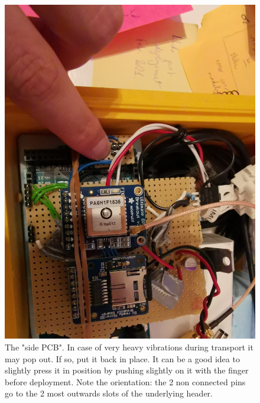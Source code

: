 \documentclass[pdftex,a4paper,12pt,twocolumn,fleqn,captions=tableheading]{scrartcl}
\begin{document}
  \begin{figure}
  \begin{center}
  \includegraphics[width=.8\textwidth]{Figures/side_pcb}
  \caption{The "side PCB". In case of very heavy vibrations during transport it may pop out. If so, put it back in place. It can be a good idea to slightly press it in position by pushing slightly on it with the finger before deployment. Note the orientation: the 2 non connected pins go to the 2 most outwards slots of the underlying header.}
  \end{center}
  \end{figure}
  
\end{document}
